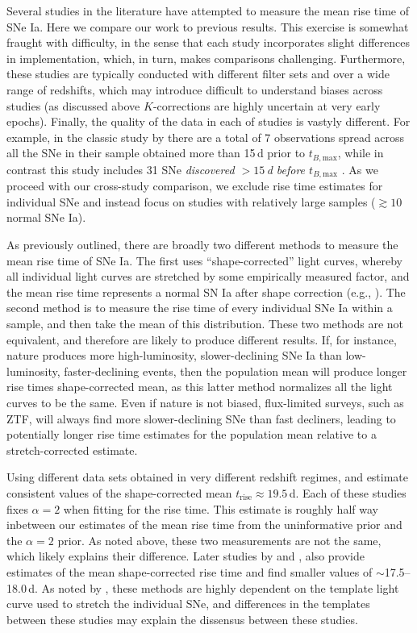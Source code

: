 \documentclass[twocolumn]{./aastex63}
\newcommand{\trise}{$t_\mathrm{rise}$}
\newcommand{\tbmax}{$t_{B,\mathrm{max}}$}
\begin{document}
Several studies in the literature have attempted to measure the mean rise time
of SNe Ia. Here we compare our work to previous results. This exercise is
somewhat fraught with difficulty, in the sense that each study incorporates
slight differences in implementation, which, in turn, makes comparisons
challenging. Furthermore, these studies are typically conducted with different
filter sets and over a wide range of redshifts, which may introduce difficult to
understand biases across studies (as discussed above $K$-corrections are highly
uncertain at very early epochs). Finally, the quality of the data in each of
studies is vastyly different. For example, in the classic study by
\citet{Riess99a} there are a total of 7 observations spread across all the SNe
in their sample obtained more than 15\,d prior to \tbmax, while in contrast this
study includes 31 SNe \textit{discovered $> 15$\,d before \tbmax} \citep{Yao19}.
As we proceed with our cross-study comparison, we exclude rise time estimates
for individual SNe and instead focus on studies with relatively large samples
($\gtrsim 10$ normal SNe Ia).

As previously outlined, there are broadly two different methods to measure the
mean rise time of SNe Ia. The first uses ``shape-corrected'' light curves,
whereby all individual light curves are stretched by some empirically measured
factor, and the mean rise time represents a normal SN Ia after shape correction
(e.g., \citep{Riess99a,Conley06,Hayden10,Ganeshalingam11}). The second method is
to measure the rise time of every individual SNe Ia within a sample, and then
take the mean of this distribution. These two methods are not equivalent, and
therefore are likely to produce different results. If, for instance, nature
produces more high-luminosity, slower-declining SNe Ia than low-luminosity,
faster-declining events, then the population mean will produce longer rise times
shape-corrected mean, as this latter method normalizes all the light curves to
be the same. Even if nature is not biased, flux-limited surveys, such as ZTF,
will always find more slower-declining SNe than fast decliners, leading to
potentially longer rise time estimates for the population mean relative to a
stretch-corrected estimate.

Using different data sets obtained in very different redshift regimes,
\citet{Riess99a} and \citet{Conley06} estimate consistent values of the
shape-corrected mean \trise$ \approx 19.5$\,d. Each of these studies fixes
$\alpha = 2$ when fitting for the rise time. This estimate is roughly half way
inbetween our estimates of the mean rise time from the uninformative prior and
the $\alpha = 2$ prior. As noted above, these two measurements are not the same,
which likely explains their difference. Later studies by \citet{Hayden10} and
\citet{Ganeshalingam11}, also provide estimates of the mean shape-corrected rise
time and find smaller values of $\sim$17.5--18.0\,d. As noted by
\citeauthor{Hayden10}, these methods are highly dependent on the template light
curve used to stretch the individual SNe, and differences in the templates
between these studies may explain the dissensus between these studies.
\end{document}
